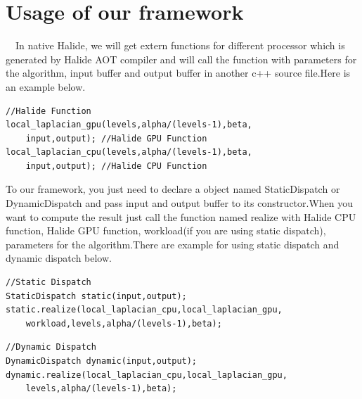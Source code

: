 \section{Usage of our framework}
\quad \ \ In native Halide, we will get extern functions for different processor which is generated by Halide AOT compiler and will call the function with parameters for the algorithm, input buffer and output buffer in another c++ source file.Here is an example below.
\lstset{language=C++} %
\begin{lstlisting}[frame=single] % Start your code-block 
//Halide Function
local_laplacian_gpu(levels,alpha/(levels-1),beta,
	input,output); //Halide GPU Function
local_laplacian_cpu(levels,alpha/(levels-1),beta,
	input,output); //Halide CPU Function
\end{lstlisting}

To our framework, you just need to declare a object named StaticDispatch or DynamicDispatch and pass input and output buffer to its constructor.When you want to compute the result just call the function named realize with Halide CPU function, Halide GPU function, workload(if you are using static dispatch), parameters for the algorithm.There are example for using static dispatch and dynamic dispatch below.
\lstset{language=C++} %
\begin{lstlisting}[frame=single] % Start your code-block 
//Static Dispatch
StaticDispatch static(input,output);
static.realize(local_laplacian_cpu,local_laplacian_gpu,
	workload,levels,alpha/(levels-1),beta);
\end{lstlisting}
\lstset{language=C++} %
\begin{lstlisting}[frame=single] % Start your code-block 
//Dynamic Dispatch
DynamicDispatch dynamic(input,output);
dynamic.realize(local_laplacian_cpu,local_laplacian_gpu,
	levels,alpha/(levels-1),beta);
\end{lstlisting}
